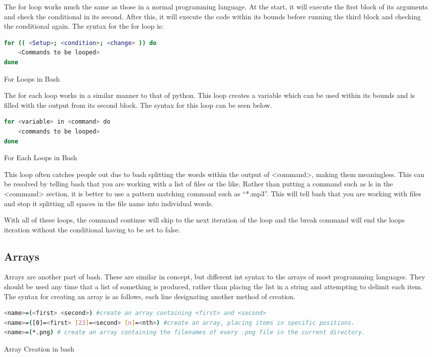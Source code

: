 			The for loop works much the same as those in a normal programming language. 
			At the start, it will execute the first block of its arguments and check the conditional in its second. 
			After this, it will execute the code within its bounds before running the third block and checking the conditional again. 
			The syntax for the for loop is:
			\begin{code}
			\begin{lstlisting}[language=bash]
for (( <Setup>; <condition>; <change> )) do
	<Commands to be looped>
done
			\end{lstlisting}
			\label{code:ForLoopBash}
			\caption{For Loops in Bash}
			\end{code}
			The for each loop works in a similar manner to that of python. 
			This loop creates a variable which can be used within its bounds and is filled with the output from its second block. 
			The syntax for this loop can be seen below. 
			\begin{code}
			\begin{lstlisting}[language=bash]
for <variable> in <command> do
	<commands to be looped>
done
			\end{lstlisting}
			\label{code:ForEachBash}
			\caption{For Each Loops in Bash}
			\end{code}
			This loop often catches people out due to bash splitting the words within the output of <command>, making them meaningless. 
			This can be resolved by telling bash that you are working with a list of files or the like. 
			Rather than putting a command such as ls in the <command> section, it is better to use a pattern matching command such as ``*.mp3''. 
			This will tell bash that you are working with files and stop it splitting all spaces in the file name into individual words. 

			With all of these loops, the command continue will skip to the next iteration of the loop and the break command will end the loops iteration without the conditional having to be set to false. 

		\subsection{Arrays}
			Arrays are another part of bash. 
			These are similar in concept, but different int syntax to the arrays of most programming languages. 
			They should be used any time that a list of something is produced, rather than placing the list in a string and attempting to delimit each item. 
			The syntax for creating an array is as follows, each line designating another method of creation. 
			\begin{code}
			\begin{lstlisting}[language=bash]
<name>=(<first> <second>) #create an array containing <first> and <second>
<name>=([0]=<first> [23]=<second> [n]=<nth>) #create an array, placing items in specific positions. 
<name>=(*.png) # create an array containing the filenames of every .png file in the current directory. 
			\end{lstlisting}
			\label{code:ArrayCreationBash}
			\caption{Array Creation in bash}
			\end{code}

